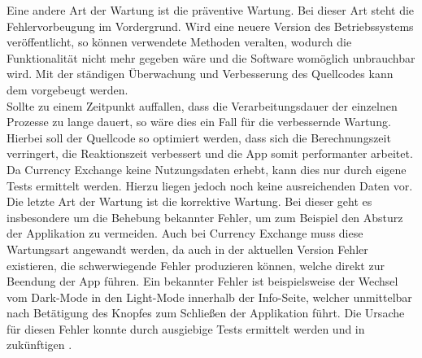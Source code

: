 \documentclass[conference]{IEEEtran}
\begin{document}
Eine andere Art der Wartung ist die präventive Wartung. Bei dieser Art steht die Fehlervorbeugung im Vordergrund. Wird eine neuere Version des Betriebssystems veröffentlicht, so können verwendete Methoden veralten, wodurch die Funktionalität nicht mehr gegeben wäre und die Software womöglich unbrauchbar wird. Mit der ständigen Überwachung und Verbesserung des Quellcodes kann dem vorgebeugt werden. \\
Sollte zu einem Zeitpunkt auffallen, dass die Verarbeitungsdauer der einzelnen Prozesse zu lange dauert, so wäre dies ein Fall für die verbessernde Wartung. Hierbei soll der Quellcode so optimiert werden, dass sich die Berechnungszeit verringert, die Reaktionszeit verbessert und die App somit performanter arbeitet. Da Currency Exchange keine Nutzungsdaten erhebt, kann dies nur durch eigene Tests ermittelt werden. Hierzu liegen jedoch noch keine ausreichenden Daten vor.\\
Die letzte Art der Wartung ist die korrektive Wartung. Bei dieser geht es insbesondere um die Behebung bekannter Fehler, um zum Beispiel den Absturz der Applikation zu vermeiden. Auch bei Currency Exchange muss diese Wartungsart angewandt werden, da auch in der aktuellen Version Fehler existieren, die schwerwiegende Fehler produzieren können, welche direkt zur Beendung der App führen. Ein bekannter Fehler ist beispielsweise der Wechsel vom Dark-Mode in den Light-Mode innerhalb der Info-Seite, welcher unmittelbar nach Betätigung des Knopfes zum Schließen der Applikation führt. Die Ursache für diesen Fehler konnte durch ausgiebige Tests ermittelt werden und in zukünftigen . 
\end{document}
